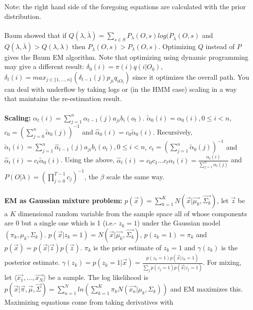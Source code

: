 Note: the right hand side of the foregoing equations are calculated with the prior distribution.
\\
\\
Baum showed that if $Q(\lambda, {\overline {\lambda}})=
\sum_{s \in S} P_{\lambda}(O,s) log(P_{\overline {\lambda}}(O,s)$ and
$Q(\lambda, {\overline {\lambda}}) >
Q(\lambda, \lambda)$  then $P_{\overline {\lambda}}(O,s)> P_{\lambda}(O,s)$.
Optimizing $Q$ instead of $P$ gives the Baum EM algorithm.  Note that optimizing
using dynamic programming may give a different result: $\delta_0(i)= \pi(i) q(i|O_0)$,
$\delta_t(i)= max_{j \in \{1, \ldots, n\}} (\delta_{t-1}(j) p_{ji} q_{i O_t})$ since
it optimizes the overall path.  You can deal with underflow by taking logs or (in the
HMM case) scaling in a way that maintains the re-estimation result.
\\
\\
{\bf Scaling:} 
$\alpha_t(i)= \sum_{j=1}^{n} \alpha_{t-1}(j) a_{ji}b_i(o_t)$.
$\tilde{\alpha}_0(i)= \alpha_0(i), 0 \le i <n$, 
$c_0= (\sum_{j=0}^{n} \tilde{\alpha}_0(j))^{-1}$ and
$\hat{\alpha}_0(i)= c_0 \tilde{\alpha}_0(i)$.  Recursively,
$\tilde{\alpha}_t(i)= \sum_{j=1}^{n} \hat{\alpha}_{t-1}(j) a_{ji}b_i(o_t),
0 \le i <n$,
$c_t= (\sum_{j=1}^{n} \tilde{\alpha}_0(j))^{-1}$ and
$\hat{\alpha}_t(i)= c_t \tilde{\alpha}_0(i)$.
Using the above, $\hat{\alpha}_t(i) = c_0 c_1 \ldots c_t \alpha_t(i)= {\frac {\alpha_t(i)}
{\sum_{j=1}^{n} \alpha_t(j)}}$ and $P(O|\lambda)= (\prod_{j=0}^{T-1} c_j)^{-1}$,
the $\beta$ scale the same way.
\\
\\
{\bf EM as Gaussian mixture problem:}
$p({\vec x})= \sum_{k=1}^K N({\vec x} | {\vec {\mu_k}}, {\vec {\Sigma_k}})$,
let ${\vec z}$ be a $K$ dimensional random variable from the
sample space all of whose components are $0$ but a single one which is 1 (i.e.- $z_k=1$) under
the Gaussian model $(\pi_k, \mu_k, \Sigma_k)$.
$p({\vec x}| z_k=1)= N({\vec x} | {\vec {\mu_k}}, {\vec {\Sigma_k}})$, $p(z_k=1)= \pi_k$ and
$p({\vec x})=
p({\vec x} | {\vec z}) p({\vec z})$.  $\pi_k$ is the prior estimate of
$z_k=1$ and $\gamma(z_k)$ is the posterior estimate.
$\gamma(z_k)= p(z_k=1| {\vec x})= {\frac {p(z_k=1) p({\vec x} | z_k=1)}
{\sum_j p(z_j=1) p({\vec x}| z_j=1)}}$.  For mixing, let 
$\langle {\vec {x_1}}, \ldots , {\vec {x_N}} \rangle$ be a sample.
The log likelihood is
$p({\vec x} | {\vec {\pi}}, {\vec {\mu}}, {\vec {\Sigma}}) =
\sum_{n=1}^N ln( \sum_{k=1}^K \pi_k N({\vec {x_n}}| \mu_k, \Sigma_k))$ and EM
maximizes this.  Maximizing equations come from taking derivatives with
